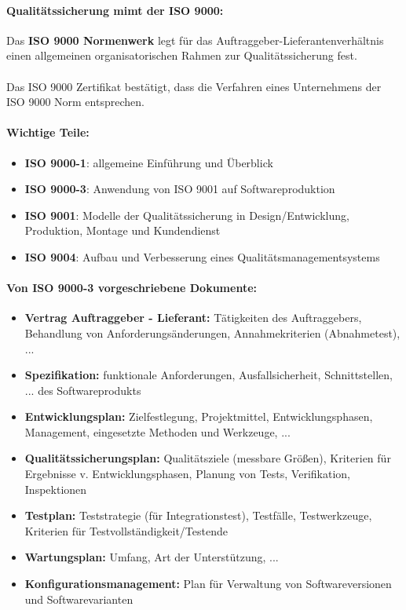 \paragraph{Qualitätssicherung mimt der ISO 9000:}
Das \textbf{ISO 9000 Normenwerk} legt für das Auftraggeber-Lieferantenverhältnis einen allgemeinen organisatorischen Rahmen zur Qualitätssicherung fest.
\\
\\
Das ISO 9000 Zertifikat bestätigt, dass die Verfahren eines Unternehmens der ISO 9000 Norm entsprechen.

\paragraph{Wichtige Teile:}
\begin{itemize}
	\item \textbf{ISO 9000-1}: allgemeine Einführung und Überblick
	\item \textbf{ISO 9000-3}: Anwendung von ISO 9001 auf Softwareproduktion
	\item \textbf{ISO 9001}: Modelle der Qualitätssicherung in Design/Entwicklung, Produktion, Montage und Kundendienst
	\item \textbf{ISO 9004}: Aufbau und Verbesserung eines Qualitätsmanagementsystems
\end{itemize}

\paragraph{Von ISO 9000-3 vorgeschriebene Dokumente:}
\begin{itemize}
	\item \textbf{Vertrag Auftraggeber - Lieferant:}  Tätigkeiten des Auftraggebers, Behandlung von Anforderungsänderungen, Annahmekriterien (Abnahmetest), ...
	\item \textbf{Spezifikation:} funktionale Anforderungen, Ausfallsicherheit, Schnittstellen, ... des Softwareprodukts
	\item \textbf{Entwicklungsplan:} Zielfestlegung, Projektmittel, Entwicklungsphasen, Management, eingesetzte Methoden und Werkzeuge, ...
	\item \textbf{Qualitätssicherungsplan:}  Qualitätsziele (messbare Größen), Kriterien für Ergebnisse v. Entwicklungsphasen, Planung von Tests, Verifikation, Inspektionen
	\item \textbf{Testplan:} Teststrategie (für Integrationstest), Testfälle, Testwerkzeuge, Kriterien für Testvollständigkeit/Testende
	\item \textbf{Wartungsplan:} Umfang, Art der Unterstützung, ...
	\item \textbf{Konfigurationsmanagement:} Plan für Verwaltung von Softwareversionen und Softwarevarianten
\end{itemize}

